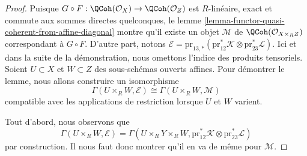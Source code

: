 \begin{proof}
Puisque $G \circ F : \QCoh(\mathcal{O}_X) \to \QCoh(\mathcal{O}_Z)$
est $R$-linéaire, exact et commute aux sommes directes quelconques,
le lemme \ref{lemma-functor-quasi-coherent-from-affine-diagonal} montre
qu'il existe un objet $\mathcal{M}$ de
$\QCoh(\mathcal{O}_{X \times_R Z})$ correspondant à $G \circ F$.
D'autre part, notons
$\mathcal{E} = \text{pr}_{13, *}(\text{pr}_{12}^*\mathcal{K}
\otimes \text{pr}_{23}^*\mathcal{L})$. Ici et dans la suite de
la démonstration, nous omettons l'indice des produits tensoriels.
Soient $U \subset X$ et $W \subset Z$ des sous-schémas ouverts affines.
Pour démontrer le lemme, nous allons construire un isomorphisme
$$
\Gamma(U \times_R W, \mathcal{E})
\cong
\Gamma(U \times_R W, \mathcal{M})
$$
compatible avec les applications de restriction lorsque $U$ et $W$ varient.

\medskip\noindent
Tout d'abord, nous observons que
$$
\Gamma(U \times_R W, \mathcal{E}) =
\Gamma(U \times_R Y \times_R W,
\text{pr}_{12}^*\mathcal{K} \otimes \text{pr}_{23}^*\mathcal{L})
$$
par construction. Il nous faut donc montrer qu'il en va de même
pour $\mathcal{M}$.


\end{proof}
